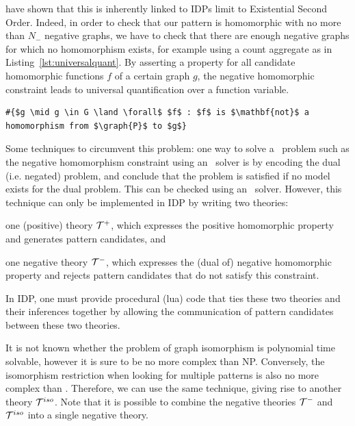 \citep{} have shown that this is inherently linked to IDPs limit to Existential Second Order.
Indeed, in order to check that our pattern  is homomorphic with no more than $N_{-}$ negative graphs, we have to check that there are enough negative graphs for which no homomorphism exists, for example using a count aggregate as in Listing~\ref{lst:universalquant}.
By asserting a property for all candidate homomorphic functions $f$ of a certain graph $g$, the negative homomorphic constraint leads to universal quantification over a function variable.

\vspace{-0.5em}
\begin{center}
\begin{minipage}{0.62\linewidth}
\begin{lstlisting}[mathescape, caption=Quantifying over functions outside the vocabulary, label=lst:universalquant]
#{$g \mid g \in G \land \forall$ $f$ : $f$ is $\mathbf{not}$ a homomorphism from $\graph{P}$ to $g$}
\end{lstlisting}
\end{minipage}
\end{center}
\vspace{-0.5em}

Some techniques to circumvent this problem: one way to solve a \coNP\ problem such as the negative homomorphism constraint using an \NP\ solver is by encoding the dual (i.e. negated) problem, and conclude that the problem is satisfied if no model exists for the dual problem.
This can be checked using an \NP\ solver.
However, this technique can only be implemented in IDP by writing two theories: 
\begin{compactitem}
\item one (positive) theory $\mathcal{T}^{+}$, which expresses the positive homomorphic property and generates pattern candidates, and
\item one negative theory $\mathcal{T}^{-}$, which expresses the (dual of) negative homomorphic property and rejects pattern candidates that do not satisfy this constraint.
\end{compactitem}
In IDP, one must provide procedural (lua) code that ties these two theories and their inferences together by allowing the communication of pattern candidates between these two theories.

It is not known whether the problem of graph isomorphism is polynomial time solvable,
however it is sure to be no more complex than NP.
Conversely, the isomorphism restriction when looking for multiple patterns is also no more complex than \coNP.
Therefore, we can use the same technique, giving rise to another theory $\mathcal{T}^{iso}$.
Note that it is possible to combine the negative theories $\mathcal{T}^{-}$ and $\mathcal{T}^{iso}$ into a single negative theory.


